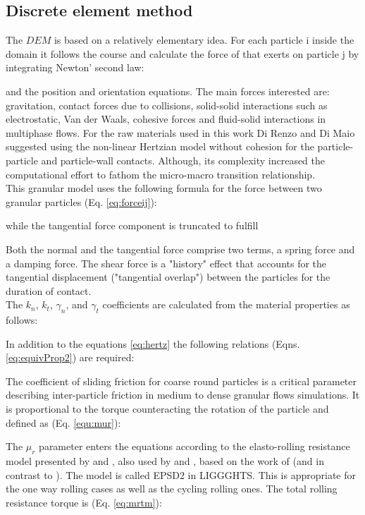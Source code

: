 \subsection{Discrete element method}
\label{subsec:dem}
The $DEM$ is based on a relatively elementary idea. For each particle i inside
the domain it follows the course and calculate the force of that exerts on particle j
by integrating Newton' second law:

and the position and orientation equations.
The main forces interested are: gravitation, contact forces due to collisions,
solid-solid interactions such as electrostatic, Van der Waals, cohesive forces
and fluid-solid interactions in multiphase flows.
For the raw materials used in this work Di Renzo and Di Maio \cite{RefWorks:145}
suggested using the non-linear Hertzian model without cohesion for the particle-particle and particle-wall contacts.
Although, its complexity increased the computational effort to fathom the
micro-macro transition relationship.\\
This granular model uses the following formula for the force between two granular particles (Eq. \ref{eq:forceij}):

while the tangential force component is truncated to fulfill

Both the normal and the tangential force comprise two terms, a spring force and a damping force. The shear force is a "history" effect that accounts for the tangential displacement 
("tangential overlap") between the particles for the duration of contact. \\

The $k_n$, $k_t$, $\gamma_n$, and $\gamma_t$ coefficients are calculated from the material properties as follows:

In addition to the equations \ref{eq:hertz} the following relations (Eqns. \ref{eq:equivProp2}) are required:

The coefficient of sliding friction for coarse round particles is a critical
parameter describing inter-particle friction in medium to dense granular flows simulations.
It is proportional to the torque counteracting the rotation of the particle and defined as (Eq. \ref{equ:mur}):

The $\mu_r$ parameter enters the equations according to the elasto-rolling
resistance model presented by \cite{RefWorks:87} and \cite{RefWorks:131}, also
used by \cite{RefWorks:147} and \cite{RefWorks:173}, based on the work of
\cite{RefWorks:143}(and in contrast to \cite{RefWorks:144}). The model is called EPSD2 in LIGGGHTS.
This is appropriate for the one way rolling cases as well as the cycling rolling ones.
The total rolling resistance torque is (Eq. \ref{eq:mrtm}):


